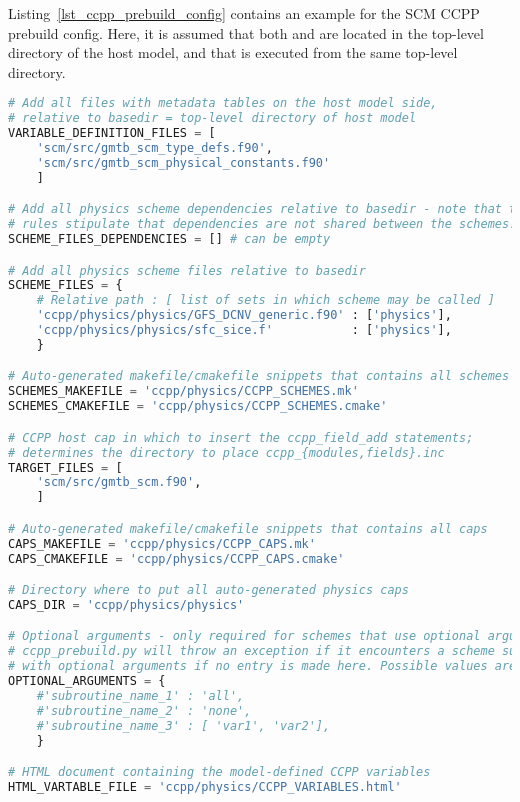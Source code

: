 Listing~\ref{lst_ccpp_prebuild_config} contains an example for the SCM CCPP prebuild config. Here, it is assumed that both  and  are located in the top-level directory of the host model, and that  is executed from the same top-level directory.
\begin{lstlisting}[language=python,
                 basicstyle=\scriptsize\ttfamily,
                 label=lst_ccpp_prebuild_config,
                 float=p,
                 caption=CCPP prebuild config for SCM (shortened)]
# Add all files with metadata tables on the host model side,
# relative to basedir = top-level directory of host model
VARIABLE_DEFINITION_FILES = [
    'scm/src/gmtb_scm_type_defs.f90',
    'scm/src/gmtb_scm_physical_constants.f90'
    ]

# Add all physics scheme dependencies relative to basedir - note that the CCPP
# rules stipulate that dependencies are not shared between the schemes!
SCHEME_FILES_DEPENDENCIES = [] # can be empty

# Add all physics scheme files relative to basedir
SCHEME_FILES = {
    # Relative path : [ list of sets in which scheme may be called ]
    'ccpp/physics/physics/GFS_DCNV_generic.f90' : ['physics'],
    'ccpp/physics/physics/sfc_sice.f'           : ['physics'],
    }

# Auto-generated makefile/cmakefile snippets that contains all schemes
SCHEMES_MAKEFILE = 'ccpp/physics/CCPP_SCHEMES.mk'
SCHEMES_CMAKEFILE = 'ccpp/physics/CCPP_SCHEMES.cmake'

# CCPP host cap in which to insert the ccpp_field_add statements;
# determines the directory to place ccpp_{modules,fields}.inc
TARGET_FILES = [
    'scm/src/gmtb_scm.f90',
    ]

# Auto-generated makefile/cmakefile snippets that contains all caps
CAPS_MAKEFILE = 'ccpp/physics/CCPP_CAPS.mk'
CAPS_CMAKEFILE = 'ccpp/physics/CCPP_CAPS.cmake'

# Directory where to put all auto-generated physics caps
CAPS_DIR = 'ccpp/physics/physics'

# Optional arguments - only required for schemes that use optional arguments.
# ccpp_prebuild.py will throw an exception if it encounters a scheme subroutine
# with optional arguments if no entry is made here. Possible values are:
OPTIONAL_ARGUMENTS = {
    #'subroutine_name_1' : 'all',
    #'subroutine_name_2' : 'none',
    #'subroutine_name_3' : [ 'var1', 'var2'],
    }

# HTML document containing the model-defined CCPP variables
HTML_VARTABLE_FILE = 'ccpp/physics/CCPP_VARIABLES.html'


\end{lstlisting}
